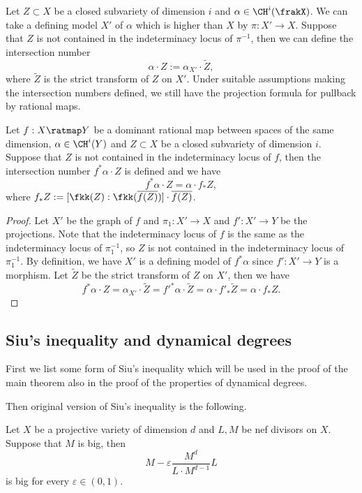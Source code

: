  Let $Z \subset X$ be a closed subvariety of dimension $i$ and $\alpha \in \CH^i(\frakX)$.
  We can take a defining model $X'$ of $\alpha$ which is higher than $X$ by $\pi: X' \to X$.
  Suppose that $Z$ is not contained in the indeterminacy locus of $\pi^{-1}$, then we can define the intersection number 
  \[ \alpha \cdot Z := \alpha_{X'} \cdot \tilde{Z}, \]
  where $\tilde{Z}$ is the strict transform of $Z$ on $X'$.
  Under suitable assumptions making the intersection numbers defined, we still have the projection formula for pullback by rational maps.

  \begin{proposition}\label{prop:projection_formula_for_pullback_by_rational_maps}
    Let $f: X \ratmap Y$ be a dominant rational map between spaces of the same dimension, $\alpha \in \CH^i(Y)$ and $Z \subset X$ be a closed subvariety of dimension $i$.
    Suppose that $Z$ is not contained in the indeterminacy locus of $f$, then the intersection number $f^* \alpha \cdot Z$ is defined and we have
    \[ f^* \alpha \cdot Z = \alpha \cdot f_*Z, \]
    where $f_*Z := [\fkk(Z) : \fkk(\overline{f(Z)})] \cdot \overline{f(Z)}$.
  \end{proposition}
  \begin{proof}
    Let $X'$ be the graph of $f$ and $\pi_1: X' \to X$ and $f': X' \to Y$ be the projections.
    Note that the indeterminacy locus of $f$ is the same as the indeterminacy locus of $\pi_1^{-1}$, so $Z$ is not contained in the indeterminacy locus of $\pi_1^{-1}$.
    By definition, we have $X'$ is a defining model of $f^* \alpha$ since $f': X' \to Y$ is a morphism.
    Let $\tilde{Z}$ be the strict transform of $Z$ on $X'$, then we have
    \[ f^* \alpha \cdot Z = \alpha_{X'} \cdot \tilde{Z} = f'^* \alpha \cdot \tilde{Z} = \alpha \cdot f'_* \tilde{Z} = \alpha \cdot f_*Z. \]
  \end{proof}


  

\subsection{Siu's inequality and dynamical degrees}

  First we list some form of Siu's inequality which will be used in the proof of the main theorem also in the proof of the properties of dynamical degrees.

  Then original version of Siu's inequality is the following.
  \begin{theorem}\label{thm:Siu_inequality}
    Let $X$ be a projective variety of dimension $d$ and $L,M$ be nef divisors on $X$.
    Suppose that $M$ is big, then 
    \[ M - \varepsilon \frac{M^d}{L \cdot M^{d-1}} L \]
    is big for every $\varepsilon \in (0,1)$. 
  \end{theorem}

